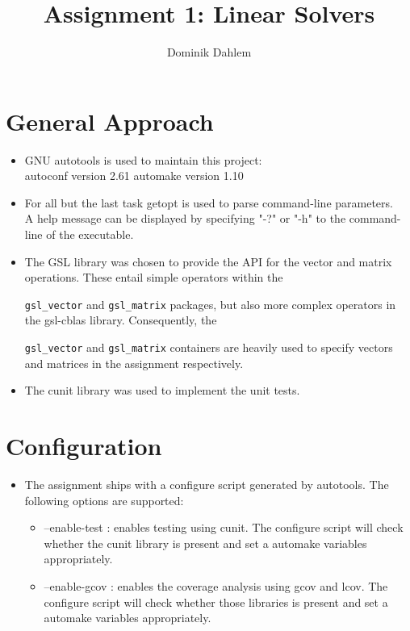 \documentclass{article}
\author{Dominik Dahlem}
\title{Assignment 1: Linear Solvers}
\def\ccode#1{
  \lstinline[basicstyle=\ttfamily,language=C]{#1} }
\begin{document}
\maketitle

\section{General Approach}
\label{sec:general-approach}
\begin{itemize}
\item GNU autotools is used to maintain this project:\\
  autoconf version 2.61 automake version 1.10
\item For all but the last task getopt is used to parse command-line
  parameters.\\
  A help message can be displayed by specifying "-?" or "-h" to the
  command-line of the executable.
\item The GSL library was chosen to provide the API for the vector and
  matrix operations. These entail simple operators within the
  \ccode{gsl_vector} and \ccode{gsl_matrix} packages, but also more
  complex operators in the gsl-cblas library. Consequently, the
  \ccode{gsl_vector} and \ccode{gsl_matrix} containers are heavily
  used to specify vectors and matrices in the assignment respectively.
\item The cunit library was used to implement the unit tests.
\end{itemize}

\section{Configuration}
\label{sec:configuration}
\begin{itemize}
\item The assignment ships with a configure script generated by
  autotools. The following options are supported:
  \begin{itemize}
  \item --enable-test : enables testing using cunit. The configure
    script will check whether the cunit library is present and set a
    automake variables appropriately.
  \item --enable-gcov : enables the coverage analysis using gcov and
    lcov. The configure script will check whether those libraries is
    present and set a automake variables appropriately.
  \end{itemize}
\end{itemize}
\end{document}
